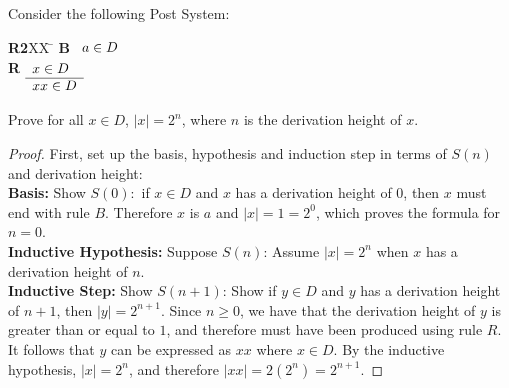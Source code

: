 \documentclass[]{exam}
\theoremstyle{definition}
\begin{document}
\begin{questions}
\begin{enumerate}[label=\alph*)]
\begin{solution}
\end{solution}
\end{enumerate}

\question Consider the following Post System:
\begin{tabbing}
{\bf R2}XX \=  \kill
{\bf B} \>
        \(\begin{array}[t]{l}
        a \in D
        \end{array}\) \\[2ex]
{\bf R} \>
        \(\begin{array}[t]{l}
        x \in D \\
        \hline
        xx \in D
        \end{array}\) 
\end{tabbing}

Prove for all $x \in D$, $|x| = 2^n$, where $n$ is the derivation height
of $x$. 
\begin{solution}
\begin{proof}
First, set up the basis, hypothesis and induction step in terms of $S(n)$ and
derivation height:
~\\
\textbf{Basis:} Show $S(0):$ if $x \in D$ and $x$ has a derivation height of
$0$, then $x$ must end with rule $B$. Therefore $x$ is $a$ and $|x| = 1 = 2^0$,
which proves the formula for $n = 0$.
~\\
\textbf{Inductive Hypothesis:} Suppose $S(n)$: Assume $|x| = 2^n$ when $x$ has 
a derivation height of $n$.
~\\
\textbf{Inductive Step:} Show $S(n+1)$: Show if $y \in D$ and $y$ has a
derivation height of $n + 1$, then $|y| = 2^{n + 1}$. Since $n \geq 0$,
we have that the derivation height of $y$ is greater than or equal to
$1$, and therefore must have been produced using rule $R$. It follows
that $y$ can be expressed as $xx$ where $x \in D$. By the inductive hypothesis,
$|x| = 2^n$, and therefore $|xx| = 2(2^n) = 2^{n+1}$.
\end{proof}

\end{solution}


\end{questions}
\end{document}
